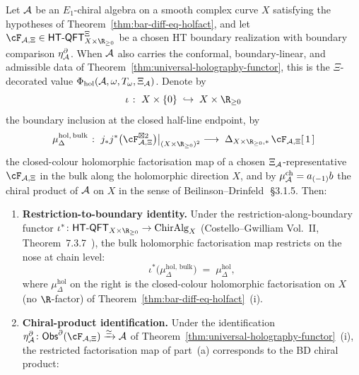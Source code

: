 \begin{theorem}
\label{thm:bulk-boundary-OPE-consistency}%
%
%
Let $\mathcal{A}$ be an $E_1$-chiral algebra on a smooth complex curve $X$
satisfying the hypotheses of Theorem~\ref{thm:bar-diff-eq-holfact},
and let
\(\cF_{\cA,\Xi}\in\HTQFT^\Xi_{X \times \R_{\geq 0}}\) be a chosen
HT boundary realization with boundary comparison
\(\eta^\partial_{\mathcal{A}}\). When \(\mathcal{A}\) also carries the conformal,
boundary-linear, and admissible data of
Theorem~\ref{thm:universal-holography-functor}, this is the
\(\Xi\)-decorated value
\(\Phi_{\mathrm{hol}}(\mathcal{A},\omega,T_\omega,\Xi_{\mathcal{A}})\). Denote by
\[
 \iota \;\colon\; X \times \{0\} \;\hookrightarrow\;
 X \times \R_{\geq 0}
\]
the boundary inclusion at the closed half-line endpoint, by
\[
 \mu^{\mathrm{hol},\,\mathrm{bulk}}_\Delta \;\colon\;
 j_*j^*\bigl(\cF_{\cA,\Xi}^{\boxtimes 2}\bigr)\bigl|_{(X\times\R_{\geq 0})^2}
 \;\longrightarrow\;
 \Delta_{X\times\R_{\geq 0},*}\,\cF_{\cA,\Xi}[\,1\,]
\]
the closed-colour holomorphic factorisation map of a chosen
\(\Xi_{\mathcal{A}}\)-representative \(\cF_{\cA,\Xi}\) in the
bulk along the holomorphic direction $X$, and by
$\mu^{\mathrm{ch}}_{\mathcal{A}} = a_{(-1)}b$ the chiral product of $\mathcal{A}$ on
$X$ in the sense of Beilinson--Drinfeld~\cite{BD04}\,\S3.1.5. Then:
\begin{enumerate}[label=\textup{(\alph*)}]
\item \textbf{Restriction-to-boundary identity.} Under the
restriction-along-boundary functor
$\iota^* \colon \HTQFT_{X\times\R_{\geq 0}} \to \mathrm{ChirAlg}_X$
(Costello--Gwilliam Vol.~II, Theorem~7.3.7~\cite{CG21}), the bulk
holomorphic factorisation map restricts on the nose at chain level:
\begin{equation}\label{eq:bulk-boundary-restriction}
 \iota^*\bigl(\mu^{\mathrm{hol},\,\mathrm{bulk}}_\Delta\bigr)
 \;=\;
 \mu^{\mathrm{hol}}_\Delta,
\end{equation}
where $\mu^{\mathrm{hol}}_\Delta$ on the right is the closed-colour
holomorphic factorisation on $X$ (no $\R$-factor) of
Theorem~\ref{thm:bar-diff-eq-holfact}~(i).
\item \textbf{Chiral-product identification.} Under the
identification
\(\eta^\partial_\cA\colon
\Obs^\partial(\cF_{\cA,\Xi})\xrightarrow{\simeq}\cA\) of
Theorem~\ref{thm:universal-holography-functor}~(i), the restricted
factorisation map of part~(a) corresponds to the BD chiral product:

\end{enumerate}
\end{theorem}
